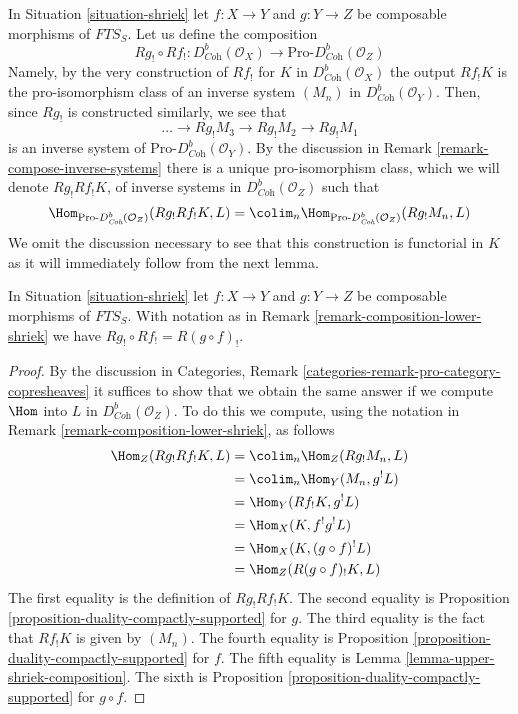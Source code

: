 \begin{remark}
\label{remark-composition-lower-shriek}
In Situation \ref{situation-shriek} let $f : X \to Y$ and $g : Y \to Z$
be composable morphisms of $\textit{FTS}_S$. Let us define the composition
$$
Rg_! \circ Rf_! :
D^b_{\textit{Coh}}(\mathcal{O}_X)
\longrightarrow
\text{Pro-}D^b_{\textit{Coh}}(\mathcal{O}_Z)
$$
Namely, by the very construction of $Rf_!$
for $K$ in $D^b_{\textit{Coh}}(\mathcal{O}_X)$
the output $Rf_!K$ is the pro-isomorphism class
of an inverse system $(M_n)$ in $D^b_{\textit{Coh}}(\mathcal{O}_Y)$.
Then, since $Rg_!$ is constructed similarly, we see that
$$
\ldots \to Rg_!M_3 \to Rg_!M_2 \to Rg_!M_1
$$
is an inverse system of $\text{Pro-}D^b_{\textit{Coh}}(\mathcal{O}_Y)$.
By the discussion in Remark \ref{remark-compose-inverse-systems}
there is a unique pro-isomorphism class, which we will denote
$Rg_! Rf_! K$, of inverse systems in $D^b_{\textit{Coh}}(\mathcal{O}_Z)$
such that
$$
\Hom_{\text{Pro-}D^b_{\textit{Coh}}(\mathcal{O}_Z)}(Rg_!Rf_!K, L) =
\colim_n \Hom_{\text{Pro-}D^b_{\textit{Coh}}(\mathcal{O}_Z)}(Rg_!M_n, L)
$$
We omit the discussion necessary to see that this construction
is functorial in $K$ as it will immediately follow from the next lemma.
\end{remark}

\begin{lemma}
\label{lemma-composition-lower-shriek}
In Situation \ref{situation-shriek} let $f : X \to Y$ and $g : Y \to Z$
be composable morphisms of $\textit{FTS}_S$. With notation as in
Remark \ref{remark-composition-lower-shriek} we have
$Rg_! \circ Rf_! = R(g \circ f)_!$.
\end{lemma}

\begin{proof}
By the discussion in
Categories, Remark \ref{categories-remark-pro-category-copresheaves}
it suffices to show that we obtain the same answer if we compute
$\Hom$ into $L$ in $D^b_{\textit{Coh}}(\mathcal{O}_Z)$. To do this
we compute, using the notation in
Remark \ref{remark-composition-lower-shriek}, as follows
\begin{align*}
\Hom_Z(Rg_!Rf_!K, L)
& =
\colim_n \Hom_Z(Rg_!M_n, L) \\
& =
\colim_n \Hom_Y(M_n, g^!L) \\
& =
\Hom_Y(Rf_!K, g^!L) \\
& =
\Hom_X(K, f^!g^!L) \\
& =
\Hom_X(K, (g \circ f)^!L) \\
& =
\Hom_Z(R(g \circ f)_!K, L)
\end{align*}
The first equality is the definition of $Rg_!Rf_!K$. The second
equality is Proposition \ref{proposition-duality-compactly-supported}
for $g$.
The third equality is the fact that $Rf_!K$ is given by $(M_n)$.
The fourth equality is
Proposition \ref{proposition-duality-compactly-supported} for $f$.
The fifth equality is Lemma \ref{lemma-upper-shriek-composition}.
The sixth is 
Proposition \ref{proposition-duality-compactly-supported} for $g \circ f$.
\end{proof}

